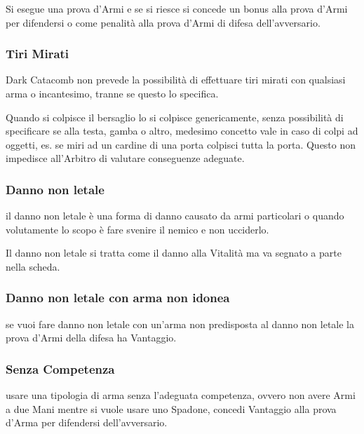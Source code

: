 \documentclass[12pt,a4paper,twoside,openany]{book}
\begin{document}
\begin{multicols}{2}
Si esegue una prova d'Armi e se si riesce si concede un bonus alla prova d'Armi per difendersi o come penalità alla prova d'Armi di difesa dell'avversario.

\subsubsection{Tiri Mirati}\label{tirimirati}

Dark Catacomb non prevede la possibilità di effettuare tiri mirati con qualsiasi arma o incantesimo, tranne se questo lo specifica.

Quando si colpisce il bersaglio lo si colpisce genericamente, senza possibilità di specificare se alla testa, gamba o altro, medesimo concetto vale in caso di colpi ad oggetti, es. se miri ad un cardine di una porta colpisci tutta la porta. Questo non impedisce all'Arbitro di valutare conseguenze adeguate.

\subsubsection{Danno non letale}\label{dannononletale}

il danno non letale è una forma di danno causato da armi particolari o quando volutamente lo scopo è fare svenire il nemico e non ucciderlo.

Il danno non letale si tratta come il danno alla Vitalità ma va segnato a parte nella scheda.

\subsubsection{Danno non letale con arma non idonea} \label{dannononletalearmanonidonea}

se vuoi fare danno non letale con un'arma non predisposta al danno non letale la prova d'Armi della difesa ha Vantaggio.

\subsubsection{Senza Competenza}\label{senzacompetenza}

usare una tipologia di arma senza l'adeguata competenza, ovvero non avere Armi a due Mani mentre si vuole usare uno Spadone, concedi Vantaggio alla prova d'Arma per difendersi dell'avversario.


\end{multicols}
\end{document}
